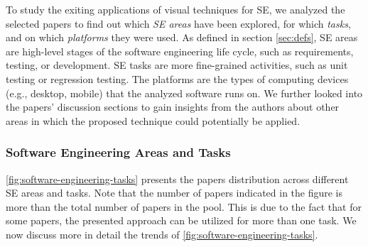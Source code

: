 \begin{figure}%
\end{figure}

To study the exiting applications of visual techniques for SE,
we analyzed the selected papers to find out
which \textit{SE areas} have been explored,
for which \textit{tasks}, and on which \textit{platforms} they were used.
As defined in section \ref{sec:defs}, SE areas are high-level stages
of the software engineering life cycle,
such as requirements, testing, or development.
SE tasks are more fine-grained activities, such as unit testing or regression testing.
The platforms are the types of computing devices (e.g., desktop, mobile) 
that the analyzed software runs on. 
We further looked into the papers' discussion sections to gain insights from
the authors about other areas in which the proposed technique could potentially be applied.

\subsubsection{Software Engineering Areas and Tasks}

\autoref{fig:software-engineering-tasks}
presents the papers distribution across different SE areas and tasks.
Note that the number of papers indicated in the figure
is more than the total number of papers in the pool.
This is due to the fact that for some papers, the presented approach can be utilized for more than one task.
We now discuss more in detail the trends of \autoref{fig:software-engineering-tasks}.

